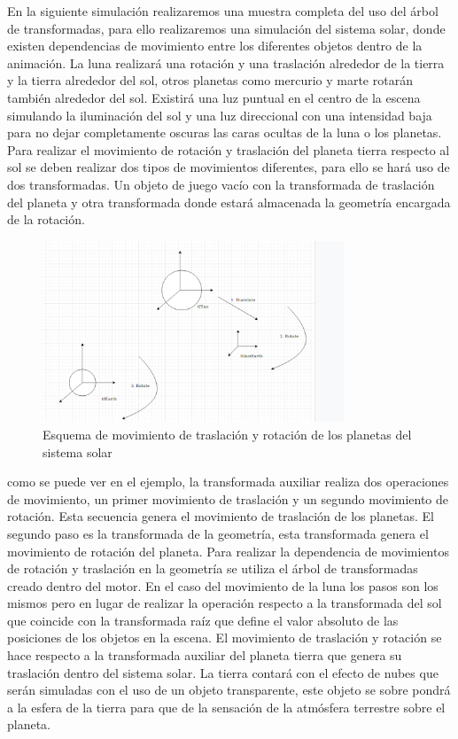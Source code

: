 \documentclass[a4paper]{book}
\begin{document}
En la siguiente simulación realizaremos una muestra completa del uso del árbol de transformadas, para ello realizaremos
una simulación del sistema solar, donde existen dependencias de movimiento entre los diferentes objetos dentro de la
animación. La luna realizará una rotación y una traslación alrededor de la tierra y la tierra alrededor del sol, otros
planetas como mercurio y marte rotarán también alrededor del sol. Existirá una luz puntual en el centro de la escena
simulando la  iluminación del sol y una luz direccional con una intensidad baja para no dejar completamente oscuras
las caras ocultas de la luna o los planetas. Para realizar el movimiento de rotación y traslación del planeta tierra respecto al
sol se deben realizar dos tipos de movimientos diferentes, para ello se hará uso de dos transformadas. Un objeto de juego vacío
con la transformada de traslación del planeta y otra transformada donde estará almacenada la geometría encargada de la rotación.

\begin{figure}[H]
    \centering
    \includegraphics[width=9cm, keepaspectratio]{img/SolarMove.png}
    \caption{Esquema de movimiento de traslación y rotación de los planetas del sistema solar}
    \label{SolarMove}
\end{figure}

como se puede ver en el ejemplo, la transformada auxiliar realiza dos operaciones de movimiento, un primer movimiento
de traslación y un segundo movimiento de rotación. Esta secuencia genera el movimiento de traslación de los planetas.
El segundo paso es la transformada de la geometría, esta transformada genera el movimiento de rotación del planeta. Para realizar la
dependencia de movimientos de rotación y traslación en la geometría se utiliza el árbol de transformadas
creado dentro del motor. En el caso del movimiento de la luna los pasos son los mismos pero en lugar de realizar la operación
respecto a la transformada del sol que coincide con la transformada raíz que define el valor absoluto de las posiciones de los
objetos en la escena. El movimiento de traslación y rotación se hace respecto a la transformada auxiliar del planeta tierra
que genera su traslación dentro del sistema solar. La tierra contará con el efecto de nubes que serán simuladas con el uso
de un objeto transparente, este objeto se sobre pondrá a la esfera de la tierra para que de la sensación de la atmósfera
terrestre sobre el planeta.
\end{document}
